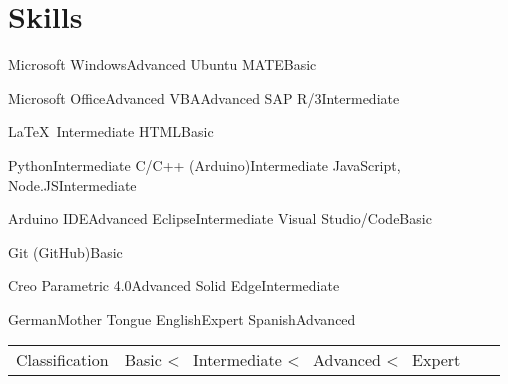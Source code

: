 
\section*{Skills}
\medskip





	{Microsoft Windows}{Advanced}
	{Ubuntu MATE}{Basic}
	{}{}
	{}{}



%
	{Microsoft Office}{Advanced}
	{VBA}{Advanced}
	{SAP R/3}{Intermediate}
	{}{}
	

%
	{\LaTeX\ }{Intermediate}
	{HTML}{Basic}
	{}{}
	{}{}
	

%
	{Python}{Intermediate}	
	{C/C++ (Arduino)}{Intermediate}
	{JavaScript, Node.JS}{Intermediate}
	{}{}



	{Arduino IDE}{Advanced}	
	{Eclipse}{Intermediate}
	{Visual Studio/Code}{Basic}
	{}{}


	{Git (GitHub)}{Basic}
	{}{}
	{}{}
	{}{}
	
	
	{Creo Parametric 4.0}{Advanced}
	{Solid Edge}{Intermediate}
	{}{}
	{}{}


	{German}{Mother Tongue}
	{English}{Expert}
	{Spanish}{Advanced}
	{}{}
	
	
\noindent
\begin{tabular*}{\textwidth}{@{}R{\BrErsteSpSkills}|lll}
	\noindent
	{\small Classification}	&	{\small Basic \textless~ Intermediate \textless~ Advanced \textless~ Expert}
\end{tabular*}
